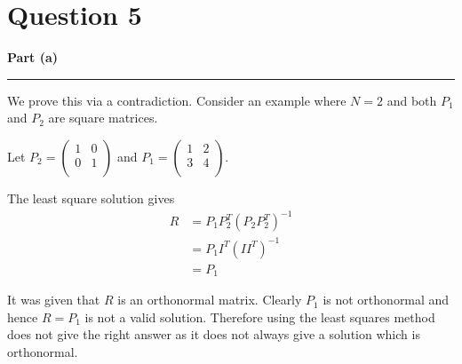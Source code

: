 \documentclass[a4paper,14pt]{article}
\title{\cooltitle{CS663 Assignment-5}}
\author{{\bf Saksham Rathi, Kavya Gupta, Shravan Srinivasa Raghavan} \\
\small Department of Computer Science, \\
Indian Institute of Technology Bombay \\}
\date{}
\newenvironment{solution}[2][]{%
    \begin{mdframed}[linecolor=blue!70!black, linewidth=2pt, roundcorner=10pt, backgroundcolor=yellow!10!white, skipabove=12pt, skipbelow=12pt]%
        \textbf{\large #2}
        \par\noindent\rule{\textwidth}{0.4pt}
}{
    \end{mdframed}
}
\begin{document}
\maketitle

\section*{Question 5}

\begin{solution}{Part (a)}
  We prove this via a contradiction. Consider an example where $N = 2$ and both $P_{1}$ and $P_{2}$ are square matrices.
    
    Let 
    $P_{2} = \begin{pmatrix}
      1 & 0 \\
      0 & 1 \\
    \end{pmatrix}$ 
    and $P_{1} = \begin{pmatrix}
      1 & 2 \\
      3 & 4 \\
    \end{pmatrix}$. 

    The least square solution gives
    \begin{align*}
      R &= P_{1}P_{2}^{T}{(P_{2}P_{2}^{T})}^{-1} \\
        &= P_{1}I^{T} {(II^{T})}^{-1} \\
        &= P_{1}    
    \end{align*}

    It was given that $R$ is an orthonormal matrix. Clearly $P_{1}$ is not orthonormal and hence $R = P_{1}$ is not a valid 
    solution. Therefore using the least squares method does not give the right answer as it does not always give a solution 
    which is orthonormal. 
\end{solution}
\end{document}
